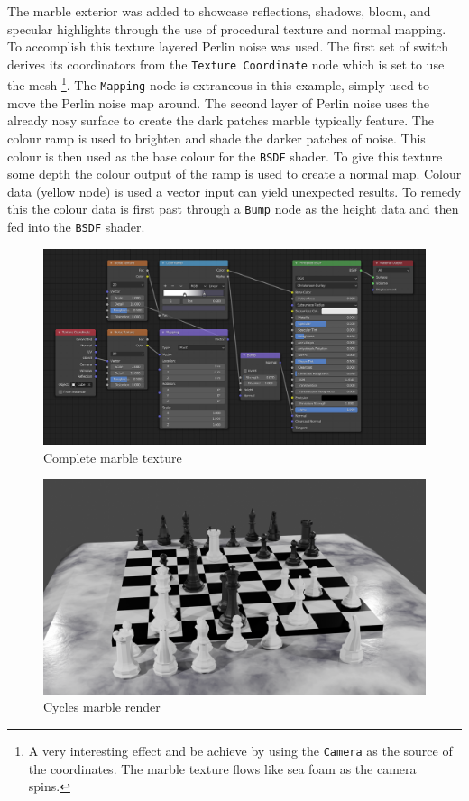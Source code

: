 \documentclass[11pt]{article}
\begin{document}
The marble exterior was added to showcase reflections, shadows, bloom, and specular
highlights through the use of procedural texture and normal mapping.\\

To accomplish this texture layered Perlin noise was used. The first set of
switch derives its coordinators from the \texttt{Texture Coordinate} node which is set
to use the mesh \footnote{A very interesting effect and be achieve by using the \texttt{Camera} as the
source of the coordinates. The marble texture flows like sea foam as the camera spins.}. The \texttt{Mapping} node is extraneous in this example, simply
used to move the Perlin noise map around. The second layer of Perlin noise uses
the already nosy surface to create the dark patches marble typically feature.
The colour ramp is used to brighten and shade the darker patches of noise. This
colour is then used as the base colour for the \texttt{BSDF} shader. To give this
texture some depth the colour output of the ramp is used to create a normal map.
Colour data (yellow node) is used a vector input can yield unexpected results.
To remedy this the colour data is first past through a \texttt{Bump} node as the height
data and then fed into the \texttt{BSDF} shader.

\begin{figure}[htbp]
\centering
\includegraphics[width=\textwidth]{Images/marbletextire.png}
\caption{\label{marble-texture}Complete marble texture}
\end{figure}

\begin{figure}[htbp]
\centering
\includegraphics[width=\textwidth]{Images/Marble cycles.png}
\caption{Cycles marble render}
\end{figure}
\end{document}
